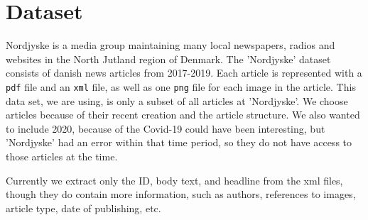 \section{Dataset}
Nordjyske is a media group maintaining many local newspapers, radios and websites in the North Jutland region of Denmark.
The 'Nordjyske' dataset consists of danish news articles from 2017-2019. 
Each article is represented with a \texttt{pdf} file and an \texttt{xml} file, as well as one \texttt{png} file for each image in the article.
This data set, we are using, is only a subset of all articles at 'Nordjyske'.
We choose articles because of their recent creation and the article structure.
We also wanted to include 2020, because of the Covid-19 could have been interesting, but 'Nordjyske' had an error within that time period, so they do not have access to those articles at the time.

Currently we extract only the ID, body text, and headline from the xml files, though they do contain more information, such as authors, references to images, article type, date of publishing, etc.